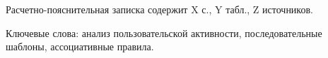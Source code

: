 
Расчетно-пояснительная записка содержит X с., Y табл., Z источников.

Ключевые слова: анализ пользовательской активности, последовательные шаблоны, ассоциативные правила.



%

